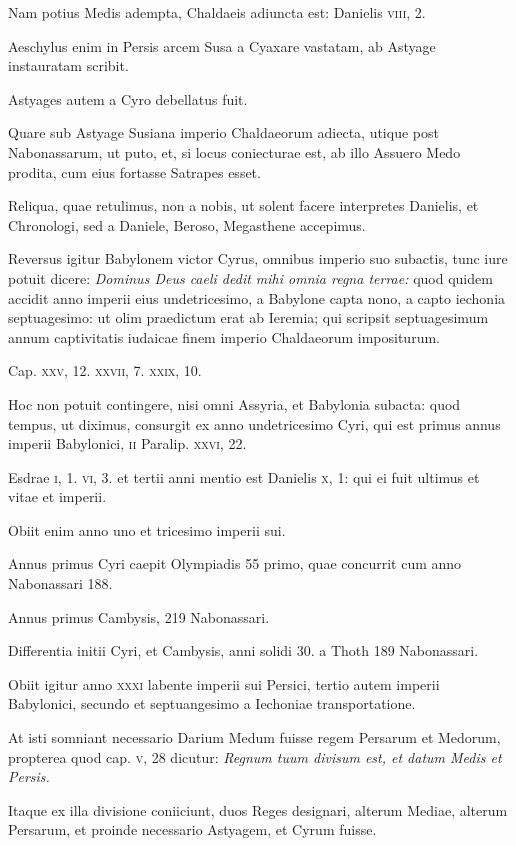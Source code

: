 \begin{parnumbers}
Nam
potius Medis adempta, Chaldaeis adiuncta est: Danielis \textsc{viii}, 2.

Aeschylus enim in Persis arcem Susa a Cyaxare vastatam, ab Astyage
instauratam scribit.

Astyages autem a Cyro debellatus fuit.

Quare sub Astyage Susiana imperio Chaldaeorum adiecta, utique
post Nabonassarum, ut puto, et, si locus coniecturae est, ab illo
Assuero Medo prodita, cum eius fortasse Satrapes esset.

Reliqua,
quae retulimus, non a nobis, ut solent facere interpretes Danielis,
et Chronologi, sed a Daniele, Beroso, Megasthene accepimus.

Reversus igitur Babylonem victor Cyrus, omnibus imperio suo
subactis, tunc iure potuit dicere: \textit{Dominus Deus caeli dedit mihi omnia
regna terrae:} quod quidem accidit anno imperii eius undetricesimo,
a Babylone capta nono, a capto iechonia septuagesimo: ut
olim praedictum erat ab Ieremia; qui scripsit septuagesimum annum
captivitatis iudaicae finem imperio Chaldaeorum impositurum.

Cap. \textsc{xxv}, 12. \textsc{xxvii}, 7. \textsc{xxix}, 10.

Hoc non potuit contingere,
nisi omni Assyria, et Babylonia subacta: quod tempus,
ut diximus, consurgit ex anno undetricesimo Cyri, qui est primus
annus imperii Babylonici, \textsc{ii} Paralip. \textsc{xxvi}, 22.

Esdrae \textsc{i}, 1.
\textsc{vi}, 3. et tertii anni mentio est Danielis \textsc{x}, 1: qui ei fuit
 ultimus et
 vitae et imperii.

Obiit enim anno uno et tricesimo imperii sui.

Annus primus Cyri caepit Olympiadis 55 primo, quae concurrit cum
anno Nabonassari 188.

Annus primus Cambysis, 219 Nabonassari.

Differentia initii Cyri, et Cambysis, anni solidi 30. a Thoth 189 Nabonassari.

Obiit igitur anno \textsc{xxxi} labente imperii sui Persici,
tertio autem imperii Babylonici, secundo et septuangesimo a
Iechoniae transportatione.

At isti somniant necessario Darium Medum
fuisse regem Persarum et Medorum, propterea quod cap. \textsc{v},
28 dicutur: \textit{Regnum tuum divisum est, et datum Medis et Persis.}

Itaque ex illa divisione coniiciunt, duos Reges designari, alterum
Mediae, alterum Persarum, et proinde necessario Astyagem, et
Cyrum fuisse.


\end{parnumbers}
